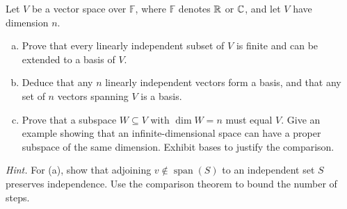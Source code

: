 \begin{exercise}
  \label{ex:hw01:basis-extension}
  Let \(V\) be a vector space over \(\mathbb F\), where
  \(\mathbb F\) denotes \(\mathbb{R}\) or \(\mathbb{C}\), and let \(V\) have dimension \(n\).
  \begin{enumerate}[(a)][2]
    \item Prove that every linearly independent subset of \(V\) is finite
      and can be extended to a basis of \(V\).
    \item Deduce that any \(n\) linearly independent vectors form a basis,
      and that any set of \(n\) vectors spanning \(V\) is a basis.
    \item Prove that a subspace \(W\subseteq V\) with \(\dim W=n\)
      must equal \(V\). Give an example showing that an infinite-dimensional
      space can have a proper subspace of the same dimension. Exhibit bases
      to justify the comparison.
  \end{enumerate}
  \emph{Hint.} For (a), show that adjoining \(v\notin\operatorname{span}(S)\)
  to an independent set \(S\) preserves independence. Use the comparison
  theorem to bound the number of steps.
\end{exercise}
